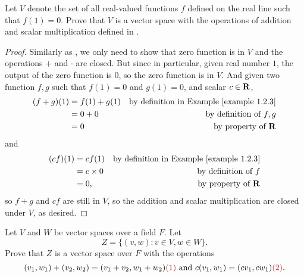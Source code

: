 \begin{exercise} \label{exercise 1.2.20}
Let \(V\) denote the set of all real-valued functions \(f\) defined on the real line such that \(f(1) = 0\).
Prove that \(V\) is a vector space with the operations
of addition and scalar multiplication defined in .
\end{exercise}

\begin{proof}
Similarly as , we only need to show that zero function is in \(V\) and the operations \(+\) and \(\cdot\) are closed.
But since in particular, given real number \(1\), the output of the zero function is \(0\), so the zero function is in \(V\).
And given two function \(f, g\) such that \(f(1) = 0\) and \(g(1) = 0\), and scalar \(c \in \mathbf{R}\),
\begin{align*}
    (f + g)(1) & = f(1) + g(1) & \text{by definition in \EXAMPLE{1.2.3}} \\
               & = 0 + 0 & \text{by definition of \(f, g\)} \\
               & = 0 & \text{by property of \(\SET{R}\)}
\end{align*}
and
\begin{align*}
    (cf)(1) & = cf(1) & \text{by definition in \EXAMPLE{1.2.3}} \\
            & = c \X 0 & \text{by definition of \(f\)} \\
            & = 0, & \text{by property of \(\SET{R}\)}
\end{align*}
so \(f + g\) and \(cf\) are still in \(V\), so the addition and scalar multiplication are closed under \(V\), as desired.
\end{proof}

\begin{exercise} \label{exercise 1.2.21}
Let \(V\) and \(W\) be vector spaces over a field \(F\).
Let
\[
    Z = \{ (v, w) : v \in V, w \in W \}.
\]
Prove that \(Z\) is a vector space over \(F\) with the operations
\[
    (v_1, w_1) + (v_2, w_2) = (v_1 + v_2, w_1 + w_2) \MAROON{(1)} \text{ and } c(v_1, w_1) = (c v_1, c w_1) \MAROON{(2)}.
\]
\end{exercise}

